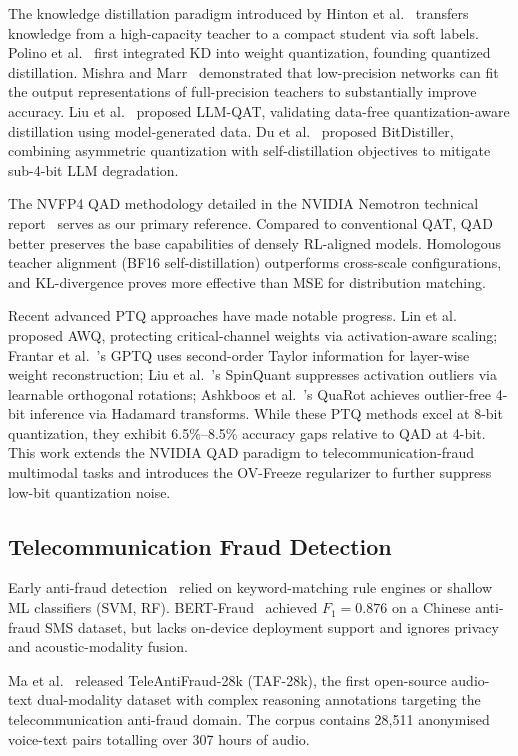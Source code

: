 \documentclass[lettersize,journal]{IEEEtran}
\begin{document}
The knowledge distillation paradigm introduced by Hinton et al.~\cite{4} transfers knowledge from a high-capacity teacher to a compact student via soft labels. Polino et al.~\cite{5} first integrated KD into weight quantization, founding quantized distillation. Mishra and Marr~\cite{6} demonstrated that low-precision networks can fit the output representations of full-precision teachers to substantially improve accuracy. Liu et al.~\cite{7} proposed LLM-QAT, validating data-free quantization-aware distillation using model-generated data. Du et al.~\cite{8} proposed BitDistiller, combining asymmetric quantization with self-distillation objectives to mitigate sub-4-bit LLM degradation.

The NVFP4 QAD methodology detailed in the NVIDIA Nemotron technical report~\cite{3} serves as our primary reference. Compared to conventional QAT, QAD better preserves the base capabilities of densely RL-aligned models. Homologous teacher alignment (BF16 self-distillation) outperforms cross-scale configurations, and KL-divergence proves more effective than MSE for distribution matching.

Recent advanced PTQ approaches have made notable progress. Lin et al.~\cite{9} proposed AWQ, protecting critical-channel weights via activation-aware scaling; Frantar et al.~\cite{10}'s GPTQ uses second-order Taylor information for layer-wise weight reconstruction; Liu et al.~\cite{11}'s SpinQuant suppresses activation outliers via learnable orthogonal rotations; Ashkboos et al.~\cite{12}'s QuaRot achieves outlier-free 4-bit inference via Hadamard transforms. While these PTQ methods excel at 8-bit quantization, they exhibit 6.5\%--8.5\% accuracy gaps relative to QAD at 4-bit. This work extends the NVIDIA QAD paradigm to telecommunication-fraud multimodal tasks and introduces the OV-Freeze regularizer to further suppress low-bit quantization noise.

\subsection{Telecommunication Fraud Detection}

Early anti-fraud detection~\cite{13,14,15} relied on keyword-matching rule engines or shallow ML classifiers (SVM, RF). BERT-Fraud~\cite{16} achieved $F_1 = 0.876$ on a Chinese anti-fraud SMS dataset, but lacks on-device deployment support and ignores privacy and acoustic-modality fusion.

Ma et al.~\cite{1} released TeleAntiFraud-28k (TAF-28k), the first open-source audio-text dual-modality dataset with complex reasoning annotations targeting the telecommunication anti-fraud domain. The corpus contains 28{,}511 anonymised voice-text pairs totalling over 307 hours of audio.
\end{document}
